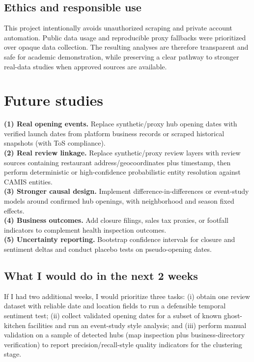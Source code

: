 \documentclass[10pt,twocolumn]{article}
\begin{document}
\subsection{Ethics and responsible use}
This project intentionally avoids unauthorized scraping and private account automation. Public data usage and reproducible proxy fallbacks were prioritized over opaque data collection. The resulting analyses are therefore transparent and safe for academic demonstration, while preserving a clear pathway to stronger real-data studies when approved sources are available.

\section{Future studies}
\textbf{(1) Real opening events.} Replace synthetic/proxy hub opening dates with verified launch dates from platform business records or scraped historical snapshots (with ToS compliance). \\
\textbf{(2) Real review linkage.} Replace synthetic/proxy review layers with review sources containing restaurant address/geocoordinates plus timestamp, then perform deterministic or high-confidence probabilistic entity resolution against CAMIS entities. \\
\textbf{(3) Stronger causal design.} Implement difference-in-differences or event-study models around confirmed hub openings, with neighborhood and season fixed effects. \\
\textbf{(4) Business outcomes.} Add closure filings, sales tax proxies, or footfall indicators to complement health inspection outcomes. \\
\textbf{(5) Uncertainty reporting.} Bootstrap confidence intervals for closure and sentiment deltas and conduct placebo tests on pseudo-opening dates.

\subsection{What I would do in the next 2 weeks}
If I had two additional weeks, I would prioritize three tasks: (i) obtain one review dataset with reliable date and location fields to run a defensible temporal sentiment test; (ii) collect validated opening dates for a subset of known ghost-kitchen facilities and run an event-study style analysis; and (iii) perform manual validation on a sample of detected hubs (map inspection plus business-directory verification) to report precision/recall-style quality indicators for the clustering stage.
\end{document}
